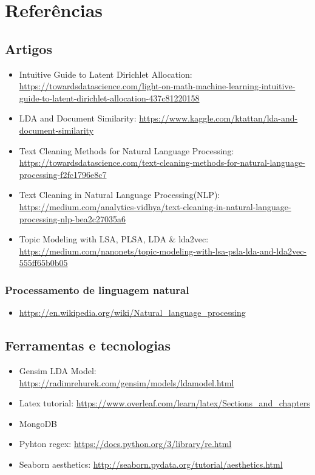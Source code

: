 \section{Referências}

\subsection{Artigos}

\begin{itemize}
    \item Intuitive Guide to Latent Dirichlet Allocation: \url{https://towardsdatascience.com/light-on-math-machine-learning-intuitive-guide-to-latent-dirichlet-allocation-437c81220158}
    \item LDA and Document Similarity: \url{https://www.kaggle.com/ktattan/lda-and-document-similarity}
    \item Text Cleaning Methods for Natural Language Processing: \url{https://towardsdatascience.com/text-cleaning-methods-for-natural-language-processing-f2fc1796e8c7}
    \item Text Cleaning in Natural Language Processing(NLP): \url{https://medium.com/analytics-vidhya/text-cleaning-in-natural-language-processing-nlp-bea2c27035a6}
    \item Topic Modeling with LSA, PLSA, LDA \& lda2vec: \url{https://medium.com/nanonets/topic-modeling-with-lsa-psla-lda-and-lda2vec-555ff65b0b05}
\end{itemize}

\subsubsection{Processamento de linguagem natural}

\begin{itemize}
    \item \url{https://en.wikipedia.org/wiki/Natural_language_processing}
\end{itemize}

\subsection{Ferramentas e tecnologias}

\begin{itemize}
    \item Gensim LDA Model: \url{https://radimrehurek.com/gensim/models/ldamodel.html}
    \item Latex tutorial: \url{https://www.overleaf.com/learn/latex/Sections\_and\_chapters}
    \item MongoDB
    \item Pyhton regex: \url{https://docs.python.org/3/library/re.html}
    \item Seaborn aesthetics: \url{http://seaborn.pydata.org/tutorial/aesthetics.html}
\end{itemize}